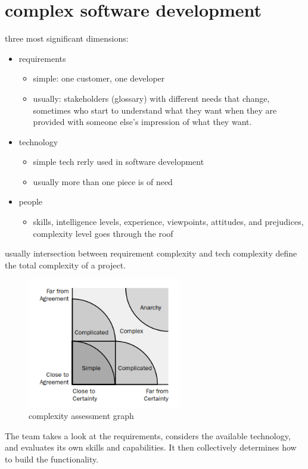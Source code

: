 \section{complex software development}

three most significant dimensions:  

\begin{itemize}
  \item requirements
  \begin{itemize}
    \item simple: one customer, one developer
    \item usually: stakeholders (glossary) with different needs that change, sometimes who start to understand what they want when they are
    provided with someone else’s impression of what they want.
  \end{itemize}
  \item technology
  \begin{itemize}
    \item simple tech rerly used in software development
    \item usually more than one piece is of need
  \end{itemize}
  \item people
  \begin{itemize}
    \item skills, intelligence levels, experience, viewpoints, attitudes, and prejudices, complexity level
    goes through the roof
  \end{itemize}
\end{itemize}

usually intersection between requirement complexity and tech complexity define the total complexity of a project. 

\begin{figure}[H]
  \centering
  \includegraphics[width=0.6\textwidth]{./figures/complexity_assessment_graph.PNG}
  \caption{complexity assessment graph}
  \label{fig:ch1-complexity_assessment_graph}
\end{figure}\bigskip

The team takes a look at the requirements, considers the available technology, and evaluates its own skills and capabilities. It then collectively determines how to build the functionality.



